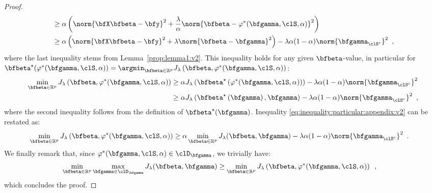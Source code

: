 \begin{proposition}
\begin{proof}
\begin{align}
        & \geq \alpha \left( 
              \norm{\bfX \bfbeta - \bfy}^2 + 
              \frac{\lambda}{\alpha} 
              \norm{\bfbeta - \varphi^{*}(\bfgamma,\clS,\alpha)}^2
            \right)  
            \label{eq:crude_inequality} \\
        & \geq \alpha \left( 
              \norm{\bfX \bfbeta - \bfy}^2 + 
              \lambda \norm{\bfbeta - \bfgamma}^2
           \right) -
           \lambda\alpha (1-\alpha) \norm{\bfgamma_{\clS^c}}^{2} 
           \enspace, \nonumber
    \end{align}
    where the last inequality stems from Lemma~\ref{prop:lemma1:v2}.
    This inequality holds for any given $\bfbeta$-value, in particular for
    $\bfbeta^\star(\varphi^{*}(\bfgamma,\clS,\alpha))=\argmin_{\bfbeta \in \mathbb{R}^{p}}
    J_\lambda\left(\bfbeta,\varphi^{*}(\bfgamma,\clS,\alpha)\right)$:
    \begin{align}       
      \min_{\bfbeta\in\mathbb{R}^{p}} 
      J_\lambda\left(\bfbeta,
                     \varphi^{*}(\bfgamma,\clS,\alpha)
               \right) 
      & \geq \alpha
          J_\lambda\left(\bfbeta^\star\left(\varphi^{*}(\bfgamma,\clS,\alpha)\right)\right) -
          \lambda\alpha (1-\alpha) \norm{\bfgamma_{\clS^c}}^{2} 
          \nonumber \\
      & \geq \alpha
          J_\lambda\left(\bfbeta^\star\left(\bfgamma\right),\bfgamma\right) -
          \lambda\alpha (1-\alpha) \norm{\bfgamma_{\clS^c}}^{2} 
          \label{eq:inequality:particular:appendix:v2} 
          \enspace,
    \end{align}
    where the second inequality follows from the definition of
    $\bfbeta^\star(\bfgamma)$.
    Inequality \eqref{eq:inequality:particular:appendix:v2} can be restated as:
     \begin{align*}       
       \min_{\bfbeta\in\mathbb{R}^{p}} 
       J_\lambda\left(\bfbeta,\varphi^{*}(\bfgamma,\clS,\alpha)\right)
       & \geq
         \alpha \min_{\bfbeta\in\mathbb{R}^{p}} 
         J_\lambda(\bfbeta,\bfgamma)  -
         \lambda\alpha (1-\alpha) \norm{\bfgamma_{\clS^c}}^{2} 
       \enspace.
    \end{align*}
    We finally remark that,  
    since $\varphi^{*}(\bfgamma,\clS,\alpha) \in \clD_{\bfgamma}$,
    we trivially have:
    \begin{align*}
      \min_{\bfbeta\in\mathbb{R}^{p}} \max_{\bfgamma \in \clD_{\bfgamma}} J_\lambda(\bfbeta,\bfgamma) 
      & \geq 
       \min_{\bfbeta\in\mathbb{R}^{p}} 
        J_\lambda\left(\bfbeta,\varphi^{*}(\bfgamma,\clS,\alpha)\right)
     \enspace,
    \end{align*}
    which concludes the proof.
  \end{proof}
\end{proposition}

